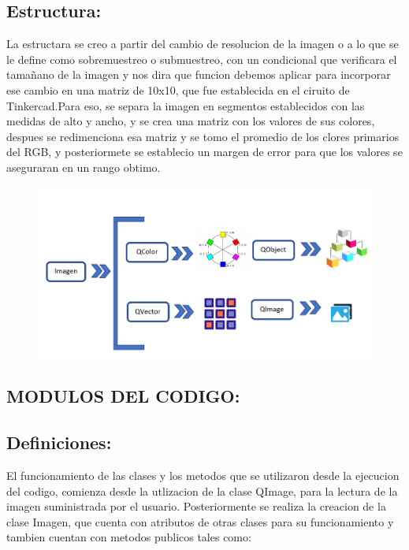 \documentclass{article}
\begin{document}
\subsection{Estructura:}
La estructara se creo a partir del cambio de resolucion de la imagen o a lo que se le define como sobremuestreo o submuestreo, con un condicional que verificara el tamañano de la imagen y nos dira que funcion debemos aplicar para incorporar ese cambio en una matriz de 10x10, que fue establecida en el ciruito de Tinkercad.Para eso, se separa la imagen en segmentos establecidos con las medidas de alto y ancho, y se crea una matriz con los valores de sus colores, despues se  redimenciona esa matriz y  se tomo el promedio de los clores primarios del RGB, y posteriormete se establecio un margen de error para que los valores se aseguraran en un rango obtimo. 


\vspace{1cm}

\begin{figure}[h]
\includegraphics[width=12cm]{estructura.PNG}
\centering
\caption{}
\label{fig:tipos}
\end{figure}


\vspace{10cm}
\begin{center}
\Huge
\section{MODULOS DEL CODIGO: }
\end{center}

\subsection{Definiciones:}
El funcionamiento de las clases y los metodos que se utilizaron desde la ejecucion del codigo, comienza desde la utlizacion de la clase QImage, para la lectura de la imagen suministrada por el usuario.
Posteriormente se realiza la creacion de la clase Imagen, que cuenta con atributos de otras clases para su funcionamiento y tambien cuentan con metodos publicos tales como:
\end{document}
